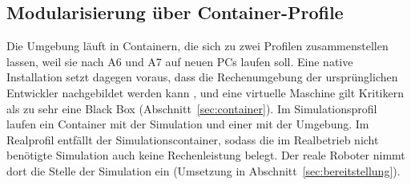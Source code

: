 \subsection{Modularisierung über Container-Profile}
\label{sec:container_profile}
Die Umgebung läuft in Containern, die sich zu zwei Profilen zusammenstellen lassen, weil sie nach A6 und A7 auf neuen PCs laufen soll.
Eine native Installation setzt dagegen voraus, dass die Rechenumgebung der ursprünglichen Entwickler nachgebildet werden kann \cite{Boettiger2015}, und eine virtuelle Maschine gilt Kritikern als zu sehr eine Black Box \cite{Boettiger2015} (Abschnitt~\ref{sec:container}).
Im Simulationsprofil laufen ein Container mit der Simulation und einer mit der Umgebung.
Im Realprofil entfällt der Simulationscontainer, sodass die im Realbetrieb nicht benötigte Simulation auch keine Rechenleistung belegt.
Der reale Roboter nimmt dort die Stelle der Simulation ein (Umsetzung in Abschnitt~\ref{sec:bereitstellung}).
